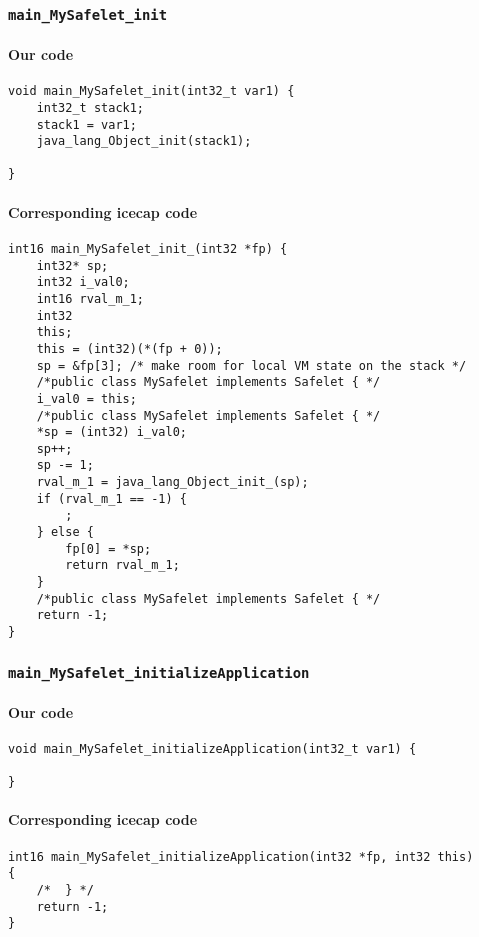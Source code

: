 \begin{landscape}
\begin{multicols}{2}
\subsubsection{\texttt{main\_MySafelet\_init}}

\paragraph{Our code}\hfill
\begin{lstlisting}[firstnumber=1970]
void main_MySafelet_init(int32_t var1) {
	int32_t stack1;
	stack1 = var1;
	java_lang_Object_init(stack1);

}
\end{lstlisting}

\paragraph{Corresponding icecap code}\hfill
\begin{lstlisting}[firstnumber=54430]
int16 main_MySafelet_init_(int32 *fp) {
	int32* sp;
	int32 i_val0;
	int16 rval_m_1;
	int32
	this;
	this = (int32)(*(fp + 0));
	sp = &fp[3]; /* make room for local VM state on the stack */
	/*public class MySafelet implements Safelet { */
	i_val0 = this;
	/*public class MySafelet implements Safelet { */
	*sp = (int32) i_val0;
	sp++;
	sp -= 1;
	rval_m_1 = java_lang_Object_init_(sp);
	if (rval_m_1 == -1) {
		;
	} else {
		fp[0] = *sp;
		return rval_m_1;
	}
	/*public class MySafelet implements Safelet { */
	return -1;
}
\end{lstlisting}

\subsubsection{\texttt{main\_MySafelet\_initializeApplication}}

\paragraph{Our code}\hfill
\begin{lstlisting}[firstnumber=2184]
void main_MySafelet_initializeApplication(int32_t var1) {
	
}
\end{lstlisting}

\paragraph{Corresponding icecap code}\hfill
\begin{lstlisting}[firstnumber=54500]
int16 main_MySafelet_initializeApplication(int32 *fp, int32 this)
{
	/*	} */
	return -1;
}
\end{lstlisting}


\end{multicols}
\end{landscape}
